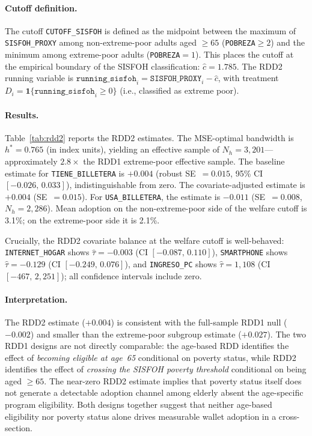 \documentclass[12pt]{article}
\begin{document}
\paragraph{Cutoff definition.}
The cutoff \texttt{CUTOFF\_SISFOH} is defined as the midpoint between the
maximum of \texttt{SISFOH\_PROXY} among non-extreme-poor adults aged $\ge 65$
(\texttt{POBREZA}$\ge 2$) and the minimum among extreme-poor adults
(\texttt{POBREZA}$=1$). This places the cutoff at the empirical boundary of
the SISFOH classification: $\hat{c}=1.785$. The RDD2 running variable is
$\texttt{running\_sisfoh}_i = \texttt{SISFOH\_PROXY}_i - \hat{c}$, with
treatment $D_i = \mathbf{1}\{\texttt{running\_sisfoh}_i \ge 0\}$ (i.e.,
classified as extreme poor).

\paragraph{Results.}
Table~\ref{tab:rdd2} reports the RDD2 estimates. The MSE-optimal bandwidth
is $h^{*}=0.765$ (in index units), yielding an effective sample of
$N_h\!=\!3{,}201$---approximately $2.8\times$ the RDD1 extreme-poor effective
sample. The baseline estimate for \texttt{TIENE\_BILLETERA} is $+0.004$
(robust SE~$=0.015$, 95\% CI $[-0.026,\,0.033]$), indistinguishable from
zero. The covariate-adjusted estimate is $+0.004$ (SE~$=0.015$). For
\texttt{USA\_BILLETERA}, the estimate is $-0.011$ (SE~$=0.008$, $N_h=2{,}286$).
Mean adoption on the non-extreme-poor side of the welfare cutoff is 3.1\%;
on the extreme-poor side it is 2.1\%.

Crucially, the RDD2 covariate balance at the welfare cutoff is
well-behaved: \texttt{INTERNET\_HOGAR} shows $\hat{\tau}=-0.003$
(CI $[-0.087,\,0.110]$), \texttt{SMARTPHONE} shows $\hat{\tau}=-0.129$
(CI $[-0.249,\,0.076]$), and \texttt{INGRESO\_PC} shows $\hat{\tau}=1{,}108$
(CI $[-467,\,2{,}251]$); all confidence intervals include zero.

\paragraph{Interpretation.}
The RDD2 estimate ($+0.004$) is consistent with the full-sample RDD1 null
($-0.002$) and smaller than the extreme-poor subgroup estimate ($+0.027$).
The two RDD1 designs are not directly comparable: the age-based RDD
identifies the effect of \emph{becoming eligible at age~65} conditional on
poverty status, while RDD2 identifies the effect of \emph{crossing the
SISFOH poverty threshold} conditional on being aged $\ge 65$. The near-zero
RDD2 estimate implies that poverty status itself does not generate a
detectable adoption channel among elderly absent the age-specific program
eligibility. Both designs together suggest that neither age-based eligibility
nor poverty status alone drives measurable wallet adoption in a cross-section.
\end{document}
